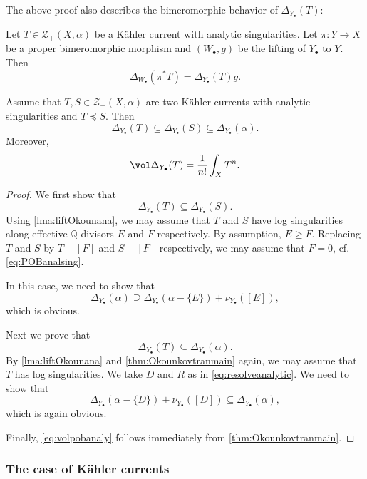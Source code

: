 The above proof also describes the bimeromorphic behavior of $\Delta_{Y_{\bullet}}(T)$:
\begin{lemma}\label{lma:liftOkounana}
Let $T\in \mathcal{Z}_{+}(X,\alpha)$ be a Kähler current with analytic singularities.
    Let $\pi\colon Y\rightarrow X$ be a proper bimeromorphic morphism and $(W_{\bullet},g)$ be the lifting of $Y_{\bullet}$ to $Y$. Then
    \[
    \Delta_{W_{\bullet}}(\pi^*T)=\Delta_{Y_{\bullet}}(T)g.
    \]
\end{lemma}

\begin{lemma}\label{lma:Okounkovanalycomp}
    Assume that $T,S\in \mathcal{Z}_+(X,\alpha)$ are two Kähler currents with analytic singularities and $T\preceq S$. Then
    \[
    \Delta_{Y_{\bullet}}(T)\subseteq \Delta_{Y_{\bullet}}(S)\subseteq \Delta_{Y_{\bullet}}(\alpha).
    \]
    Moreover,
    \begin{equation}\label{eq:volpobanaly}
\vol \Delta_{Y_{\bullet}}(T)=\frac{1}{n!} \int_X T^n.
\end{equation}
\end{lemma}
\begin{proof}
    We first show that
    \[
    \Delta_{Y_{\bullet}}(T)\subseteq \Delta_{Y_{\bullet}}(S).
    \]
    Using \cref{lma:liftOkounana}, we may assume that $T$ and $S$ have log singularities along effective $\mathbb{Q}$-divisors $E$ and $F$ respectively. By assumption, $E\geq F$. Replacing $T$ and $S$ by $T-[F]$ and $S-[F]$ respectively, we may assume that $F=0$, cf. \eqref{eq:POBanalsing}.

    In this case, we need to show that
    \[
    \Delta_{Y_{\bullet}}(\alpha)\supseteq \Delta_{Y_{\bullet}}(\alpha-\{E\})+\nu_{Y_{\bullet}}([E]),
    \]
    which is obvious.

    Next we prove that
    \[
    \Delta_{Y_{\bullet}}(T)\subseteq \Delta_{Y_{\bullet}}(\alpha).
    \]
    By \cref{lma:liftOkounana} and \cref{thm:Okounkovtranmain} again, we may assume that $T$ has log singularities. We take $D$ and $R$ as in \eqref{eq:resolveanalytic}. We need to show that
    \[
    \Delta_{Y_{\bullet}}(\alpha-\{D\})+\nu_{Y_{\bullet}}([D])\subseteq \Delta_{Y_{\bullet}}(\alpha),
    \]
    which is again obvious.

    Finally, \eqref{eq:volpobanaly} follows immediately from \cref{thm:Okounkovtranmain}.
\end{proof}

\subsubsection{The case of Kähler currents}
\label{subsubsec:tpob_Kahler}

